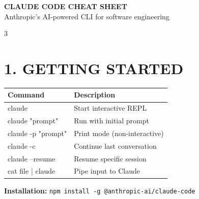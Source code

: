 \documentclass[landscape,11pt]{article}
\begin{document}
\begin{center}
{\Huge \textbf{CLAUDE CODE CHEAT SHEET}}\\[3mm]
{\large Anthropic's AI-powered CLI for software engineering}\\[5mm]
\end{center}

\begin{multicols}{3}

\section*{\textcolor{claudeorange}{1. GETTING STARTED}}
\renewcommand{\arraystretch}{1.15}
\begin{tabularx}{\linewidth}{@{}>{\ttfamily}l>{\raggedright\arraybackslash}X@{}}
\normalfont\textbf{Command} & \textbf{Description}\\
\hline
claude & Start interactive REPL\\
claude "prompt" & Run with initial prompt\\
claude -p "prompt" & Print mode (non-interactive)\\
claude -c & Continue last conversation\\
claude --resume & Resume specific session\\
cat file | claude & Pipe input to Claude\\
\end{tabularx}
\renewcommand{\arraystretch}{1}

\vspace{2mm}
\begin{tcolorbox}[colback=claudeorange!8, colframe=claudeorange, boxsep=2pt, arc=1pt, fontupper=\small]
\textbf{Installation:} \texttt{npm install -g @anthropic-ai/claude-code}
\end{tcolorbox}


\end{multicols}
\end{document}
